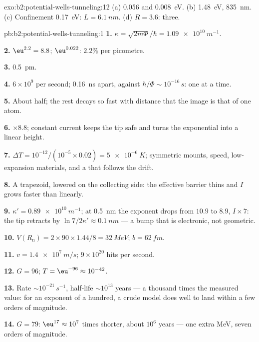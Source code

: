 \begin{solution}{exo:b2:potential-wells-tunneling:12}
(a) \qty{0.056}{} and \qty{0.008}{eV}. (b) \qty{1.48}{eV}, \qty{835}{nm}. (c) Confinement
\qty{0.17}{eV}: $L = \qty{6.1}{nm}$. (d) $R = 3.6$: three.
\end{solution}

\begin{solution}{pb:b2:potential-wells-tunneling:1}
\textbf{1.} $\kappa = \sqrt{2m\Phi}/\hbar = \qty{1.09e10}{m^{-1}}$.

\textbf{2.} $\eu^{2.2} = 8.8$; $\eu^{0.022}$: $2.2\%$ per picometre.

\textbf{3.} \qty{0.5}{pm}.

\textbf{4.} $6 \times 10^9$ per second; \qty{0.16}{ns} apart, against $\hbar/\Phi
\sim 10^{-16}\,\unit{s}$: one at a time.

\textbf{5.} About half; the rest decays so fast with distance that the
image is that of one atom.

\textbf{6.} $\times 8.8$; constant current keeps the tip safe and turns
the exponential into a linear height.

\textbf{7.} $\Delta T = 10^{-12}/(10^{-5} \times 0.02) = \qty{5e-6}{K}$; symmetric
mounts, speed, low-expansion materials, and a  that follows the
drift.

\textbf{8.} A trapezoid, lowered on the collecting side: the effective
barrier thins and $I$ grows faster than linearly.

\textbf{9.} $\kappa' = \qty{0.89e10}{m^{-1}}$; at \qty{0.5}{nm} the exponent drops from
$10.9$ to $8.9$, $I \times 7$: the tip retracts by $\ln 7/2\kappa' \approx \qty{0.1}{nm}$
--- a bump that is electronic, not geometric.

\textbf{10.} $V(R_{\text{n}}) = 2 \times 90 \times 1.44/8 = \qty{32}{MeV}$; $b = \qty{62}{fm}$.

\textbf{11.} $v = \qty{1.4e7}{m/s}$; $9 \times 10^{20}$ hits per second.

\textbf{12.} $G = 96$; $T = \eu^{-96} \approx 10^{-42}$.

\textbf{13.} Rate $\sim 10^{-21}\,\unit{s^{-1}}$, half-life $\sim 10^{13}$ years --- a
thousand times the measured value: for an exponent of a hundred, a
crude model does well to land within a few orders of magnitude.

\textbf{14.} $G = 79$: $\eu^{17} \approx 10^7$ times shorter, about $10^6$ years ---
one extra MeV, seven orders of magnitude.


\end{solution}
